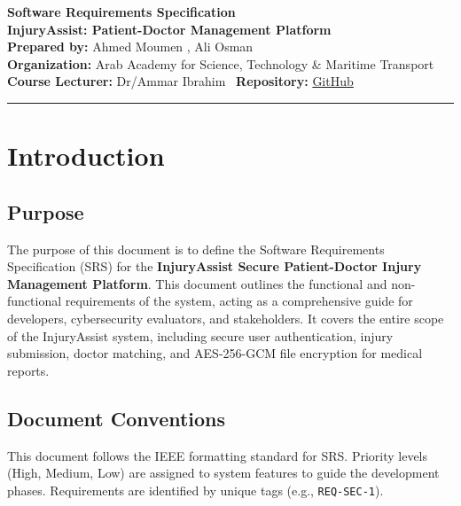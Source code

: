 \documentclass[11pt,a4paper]{article}
\begin{document}
\begin{center}
    {\Huge \textbf{Software Requirements Specification}} \\
    \vspace{0.3cm}
    {\LARGE \textbf{InjuryAssist: Patient-Doctor Management Platform}} \\
    \vspace{0.6cm}
    \textbf{Prepared by:} Ahmed Moumen , Ali Osman \\
    \vspace{0.2cm}
    \textbf{Organization:} Arab Academy for Science, Technology \& Maritime Transport \\
    \textbf{Course Lecturer:} Dr/Ammar Ibrahim \textperiodcentered\ \textbf{Repository:} \href{https://github.com/Ali-CTRLS/cyber--repo}{GitHub} \\
    \vspace{0.4cm}
    \hrule
\end{center}

\tableofcontents
\newpage

\section{Introduction}

\subsection{Purpose}
The purpose of this document is to define the Software Requirements Specification (SRS) for the \textbf{InjuryAssist Secure Patient-Doctor Injury Management Platform}. This document outlines the functional and non-functional requirements of the system, acting as a comprehensive guide for developers, cybersecurity evaluators, and stakeholders. It covers the entire scope of the InjuryAssist system, including secure user authentication, injury submission, doctor matching, and AES-256-GCM file encryption for medical reports.

\subsection{Document Conventions}
This document follows the IEEE formatting standard for SRS. Priority levels (High, Medium, Low) are assigned to system features to guide the development phases. Requirements are identified by unique tags (e.g., \texttt{REQ-SEC-1}).
\end{document}

